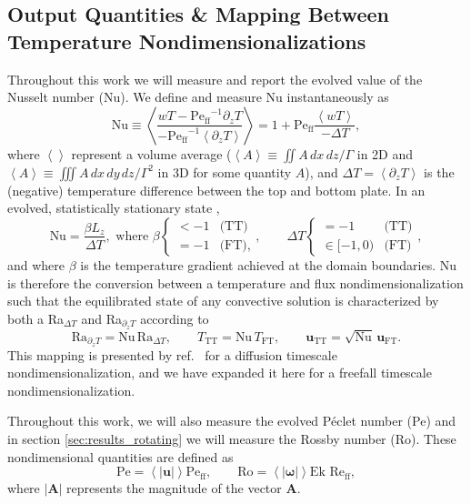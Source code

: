 \documentclass[aps, pre, onecolumn, nofootinbib, notitlepage, groupedaddress, amsfonts, amssymb, amsmath, longbibliography, superscriptaddress]{revtex4-1}
\newcommand{\angles}[1]{\ensuremath{\left\langle #1 \right\rangle}}
\newcommand{\Reff}{\ensuremath{\text{Re}_{\text{ff}}}}
\newcommand{\Peff}{\ensuremath{\text{Pe}_{\text{ff}}}}
\newcommand{\ea}[1]{{\color{red} #1}}
\begin{document}
\ea{
\subsection{Output Quantities \& Mapping Between Temperature Nondimensionalizations}
}
\label{sec:ra_nu_relations}
Throughout this work we will measure and report the evolved value of the Nusselt number (Nu).
We define and measure Nu instantaneously as
\begin{equation}
\text{Nu} \equiv \angles{\frac{w T - \Peff^{-1} \partial_z T}{-\Peff^{-1} \angles{\partial_z T}}}
= 1 + \Peff\frac{\angles{w T}}{-\Delta T},
\end{equation}
where $\angles{}$ represent a volume average ($\angles{A} \equiv \iint A\,dx\,dz / \Gamma$ in 2D and $\angles{A} \equiv \iiint A\,dx\,dy\,dz / \Gamma^2$ in 3D for some quantity $A$), and $\Delta T = \angles{\partial_z T}$ is the (negative) temperature difference between the top and bottom plate.
\ea{In an evolved, statistically stationary state \cite{calkins&all2015}, 
\begin{equation}
\text{Nu} = \frac{\beta L_z}{\Delta T}, \,\,\text{where}\,\,
\beta \begin{cases}
< -1 & \text{(TT)} \\
= -1 & \text{(FT)},
\end{cases},
\qquad
\Delta T \begin{cases}
= -1 & \text{(TT)} \\
\in [-1, 0) & \text{(FT)}
\end{cases},
\label{eqn:evolved_nu}
\end{equation}
and where $\beta$ is the temperature gradient achieved at the domain boundaries.
Nu is therefore the conversion between a temperature and flux nondimensionalization such that the equilibrated state of any convective solution is characterized by both a Ra$_{\Delta T}$ and Ra$_{\partial_z T}$ according to
\begin{equation}
\text{Ra}_{\partial_z T} =\text{Nu}\, \text{Ra}_{\Delta T},
\qquad
T_{\text{TT}} = \text{Nu}\, T_{\text{FT}},
\qquad
\bm{u}_{\text{TT}} = \sqrt{\text{Nu}}\, \bm{u}_{\text{FT}}.
\label{eqn:ra_relation}
\end{equation}
This mapping is presented by ref.~\cite{calkins&all2015} for a diffusion timescale nondimensionalization, and we have expanded it here for a freefall timescale nondimensionalization.}



Throughout this work, we will also measure the evolved P\'{e}clet number (Pe) and in section \ref{sec:results_rotating} we will measure the Rossby number (Ro).
These nondimensional quantities are defined as
\begin{equation}
\text{Pe} = \angles{|\bm{u}|}\Peff,\qquad \text{Ro} = \angles{|\bm{\omega}|}\text{Ek }\Reff,
\end{equation}
where $|\bm{A}|$ represents the magnitude of the vector $\bm{A}$.
\end{document}
